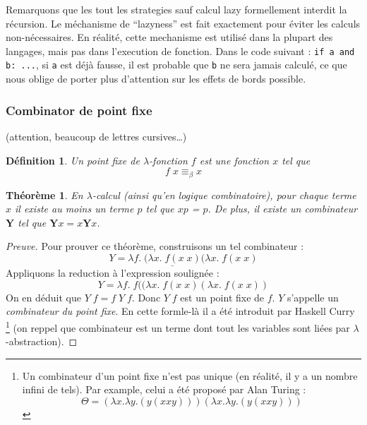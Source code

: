 \documentclass[12pt, a4paper]{article}
\newcommand{\lx}{\lambda x}
\newcommand{\ly}{\lambda y}
\newtheorem*{definition}{Définition}
\newtheorem*{theorem}{Théorème}
\begin{document}
Remarquons que les tout les strategies sauf calcul lazy formellement interdit la récursion.
Le méchanisme de ``lazyness'' est fait exactement pour éviter les calculs non-nécessaires.
En réalité, cette mechanisme est utilisé dans la plupart des langages, mais pas dans l'execution de fonction. Dans le code suivant : \verb|if a and b: ...|, si \verb|a| est déjà fausse, il est probable que \verb|b| ne sera jamais calculé, ce que nous oblige de porter plus d'attention sur les effets de bords possible.

\subsubsection*{Combinator de point fixe} (attention, beaucoup de lettres cursives\ldots)
\begin{definition}
	\emph{Un point fixe} de $\lambda$-fonction $f$ est une fonction $x$ tel que $$f \; x \equiv_\beta x$$
\end{definition}
\begin{theorem}
	En $\lambda$-calcul (ainsi qu'en logique combinatoire), pour chaque terme $x$ il existe au moins un terme $p$ tel que $xp$ = $p$.
	De plus, il existe un combinateur $\mathbf{Y}$ tel que $\mathbf{Y} x = x \mathbf{Y} x$.
\end{theorem}
\begin{proof}[Preuve]
	Pour prouver ce théorème, construisons un tel combinateur :
	$$Y = \lambda f. \; \underline{(\lambda x. \; f(x \; x)} (\lambda x. \; f(x \; x)$$
	Appliquons la reduction à l'expression soulignée :
	$$Y = \lambda f. \; f ((\lambda x. \; f(x \; x) (\lambda x. \; f(x \; x))$$
	On en déduit que $Y \; f = f \; Y \; f$.
	Donc $Y \; f$ est un point fixe de $f$.
	$Y$ s'appelle un \emph{combinateur du point fixe}.
	En cette formle-là il a été introduit par Haskell Curry
	\footnote{
		Un combinateur d'un point fixe n'est pas unique (en réalité, il y a un nombre infini de tels).
		Par example, celui a été proposé par Alan Turing : $$\Theta = (\lx.\ly.(y(xxy)))(\lx.\ly.(y(xxy)))$$
	}
	(on reppel que combinateur est un terme dont tout les variables sont liées par $\lambda$-abstraction).
\end{proof}
\end{document}
